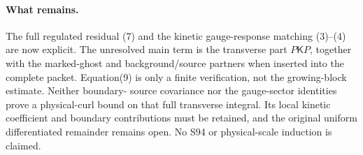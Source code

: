 \documentclass[11pt]{article}
\begin{document}
\paragraph{What remains.}
The full regulated residual (7) and the kinetic gauge-response matching
(3)--(4) are now explicit. The unresolved main term is the transverse
part $P\mathsf K P$, together with the marked-ghost and background/source
partners when inserted into the complete packet. Equation(9) is only a
finite verification, not the growing-block estimate. Neither boundary-
source covariance nor the gauge-sector identities prove a physical-curl
bound on that full transverse integral. Its local kinetic coefficient
and boundary contributions must be retained, and the original uniform
differentiated remainder remains open. No S94 or physical-scale induction
is claimed.
\end{document}

